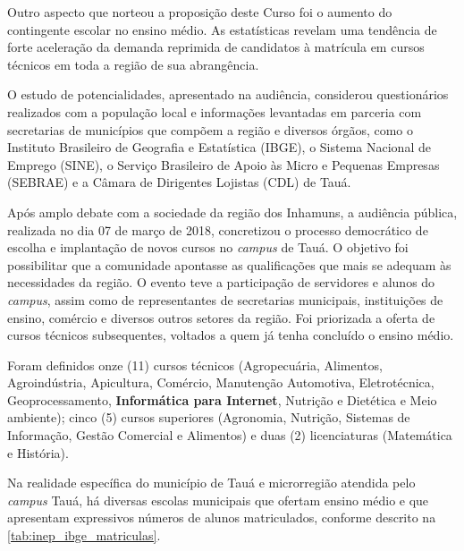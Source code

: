 	
Outro aspecto que norteou a proposição deste Curso foi o aumento do contingente
escolar no ensino médio. As estatísticas revelam uma tendência de forte
aceleração da demanda reprimida de candidatos à matrícula em cursos técnicos em
toda a região de sua abrangência. 

O estudo de potencialidades, apresentado na audiência, considerou questionários
realizados com a população local e informações levantadas em parceria com
secretarias de municípios que compõem a região e diversos órgãos, como o
Instituto Brasileiro de Geografia e Estatística (IBGE), o Sistema Nacional de
Emprego (SINE), o Serviço Brasileiro de Apoio às Micro e Pequenas Empresas
(SEBRAE) e a Câmara de Dirigentes Lojistas (CDL) de Tauá.

Após amplo debate com a sociedade da região dos Inhamuns, a audiência pública,
realizada no dia 07 de março de 2018, concretizou o processo democrático de
escolha e implantação de novos cursos no \textit{campus} de Tauá. O objetivo foi
possibilitar que a comunidade apontasse as qualificações que mais se adequam às
necessidades da região. O evento teve a participação de servidores e alunos do
\textit{campus}, assim como de representantes de secretarias municipais, instituições de
ensino, comércio e diversos outros setores da região. Foi priorizada a oferta de
cursos técnicos subsequentes, voltados a quem já tenha concluído o ensino médio.


Foram definidos onze (11) cursos técnicos (Agropecuária, Alimentos,
Agroindústria, Apicultura, Comércio, Manutenção Automotiva, Eletrotécnica,
Geoprocessamento, \textbf{Informática para Internet}, Nutrição e Dietética e 
Meio ambiente); cinco (5) cursos superiores (Agronomia, Nutrição, Sistemas de
Informação, Gestão Comercial e Alimentos) e duas (2) licenciaturas (Matemática e
História).



Na realidade específica do município de Tauá e microrregião atendida pelo
\textit{campus} Tauá, há diversas escolas municipais que ofertam ensino médio e
que apresentam expressivos números de alunos matriculados, conforme descrito na
\autoref{tab:inep_ibge_matriculas}.


